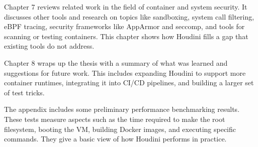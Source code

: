 \begin{doublespace}
Chapter 7 reviews related work in the field of container and system security. It discusses other tools and research on topics like sandboxing, system call filtering, eBPF tracing, security frameworks like AppArmor and seccomp, and tools for scanning or testing containers. This chapter shows how Houdini fills a gap that existing tools do not address.

Chapter 8 wraps up the thesis with a summary of what was learned and suggestions for future work. This includes expanding Houdini to support more container runtimes, integrating it into CI/CD pipelines, and building a larger set of test tricks.

The appendix includes some preliminary performance benchmarking results. These tests measure aspects such as the time required to make the root filesystem, booting the VM, building Docker images, and executing specific commands. They give a basic view of how Houdini performs in practice.



\end{doublespace}